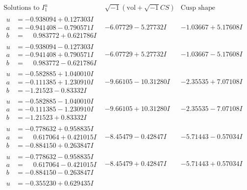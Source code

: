 \documentclass[1p]{elsarticle_modified}
\theoremstyle{definition}
\newcommand{\I}{\sqrt{-1}}
\begin{document}
$$\begin{array}{c|c|c}  
\text{Solutions to }I^u_{1}& \I (\text{vol} + \sqrt{-1}CS) & \text{Cusp shape}\\
 \hline 
\begin{aligned}
u &= -0.938094 + 0.127303 I \\
a &= -0.941408 - 0.790571 I \\
b &= \phantom{-}0.983772 + 0.621786 I\end{aligned}
 & -6.07729 - 5.27732 I & -1.03667 + 5.17608 I \\ \hline\begin{aligned}
u &= -0.938094 - 0.127303 I \\
a &= -0.941408 + 0.790571 I \\
b &= \phantom{-}0.983772 - 0.621786 I\end{aligned}
 & -6.07729 + 5.27732 I & -1.03667 - 5.17608 I \\ \hline\begin{aligned}
u &= -0.582885 + 1.040010 I \\
a &= -0.111385 + 1.230910 I \\
b &= -1.21523 - 0.83332 I\end{aligned}
 & -9.66105 - 10.31280 I & -2.35535 + 7.07108 I \\ \hline\begin{aligned}
u &= -0.582885 - 1.040010 I \\
a &= -0.111385 - 1.230910 I \\
b &= -1.21523 + 0.83332 I\end{aligned}
 & -9.66105 + 10.31280 I & -2.35535 - 7.07108 I \\ \hline\begin{aligned}
u &= -0.778632 + 0.958835 I \\
a &= \phantom{-}0.617064 + 0.421015 I \\
b &= -0.884150 + 0.263847 I\end{aligned}
 & -8.45479 - 0.42847 I & -5.71443 - 0.57034 I \\ \hline\begin{aligned}
u &= -0.778632 - 0.958835 I \\
a &= \phantom{-}0.617064 - 0.421015 I \\
b &= -0.884150 - 0.263847 I\end{aligned}
 & -8.45479 + 0.42847 I & -5.71443 + 0.57034 I \\ \hline\begin{aligned}
u &= -0.355230 + 0.629435 I \\

\end{aligned}
\end{array}$$
\end{document}
